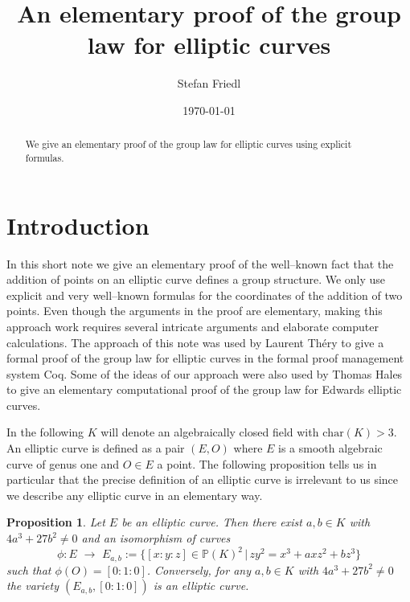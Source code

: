 \documentclass[12pt]{amsart}
\theoremstyle{plain}
\newtheorem{proposition}[theorem]{Proposition}
\theoremstyle{remark}
\theoremstyle{definition}
\def\Char{\mbox{char}}
\begin{document}
\title{An elementary proof of the group law for elliptic curves}

\author{Stefan Friedl}
\address{Fakult\"at f\"ur Mathematik\\ Universit\"at Regensburg\\93040 Regensburg\\   Germany}

\date{\today}
\begin{abstract}
We give an elementary proof of the group law for elliptic curves using explicit formulas.
 \end{abstract}
\maketitle



\section{Introduction}

In this short note we give an elementary proof of the well--known fact that the addition of points on an elliptic curve defines a group structure. We only use explicit and very well--known formulas for the coordinates of the addition of two points.
Even though the arguments in the proof are elementary, making this approach work requires several intricate arguments and elaborate computer calculations. The approach of this note was used by Laurent Th\'ery  \cite{Th07} to give a formal proof of the group law for elliptic curves in the formal proof management system Coq.
Some of the ideas of our approach were also  used by Thomas Hales~\cite{Ha16} to give an  elementary computational proof of the
group
law for Edwards elliptic curves.


In the following $K$ will denote an algebraically closed field with $\Char(K)>3$.
An elliptic curve is defined as  a pair $(E,O)$ where $E$ is a smooth algebraic
curve of genus one  and $O\in E$ a point. The following proposition tells us in particular that the precise definition of an elliptic curve is irrelevant to us since we describe any elliptic curve in an elementary way.

\begin{proposition}\cite[Prop.~3.1]{Si86}
Let $E$ be an elliptic curve.
Then there exist $a,b\in K$ with $4a^3+27b^2\ne 0$ and an isomorphism
of curves
\[ \phi\colon E \,\,\to\,\, E_{a,b}:=\{ [x:y:z]\in \mathbb{P}(K)^2 \,|\, zy^2=x^3+axz^2+bz^3 \} \]
such that $\phi(O)=[0:1:0]$. Conversely, for any $a,b\in K$ with $4a^3+27b^2\ne 0$
the variety $(E_{a,b},[0:1:0])$ is an elliptic curve.
\end{proposition}
\end{document}
